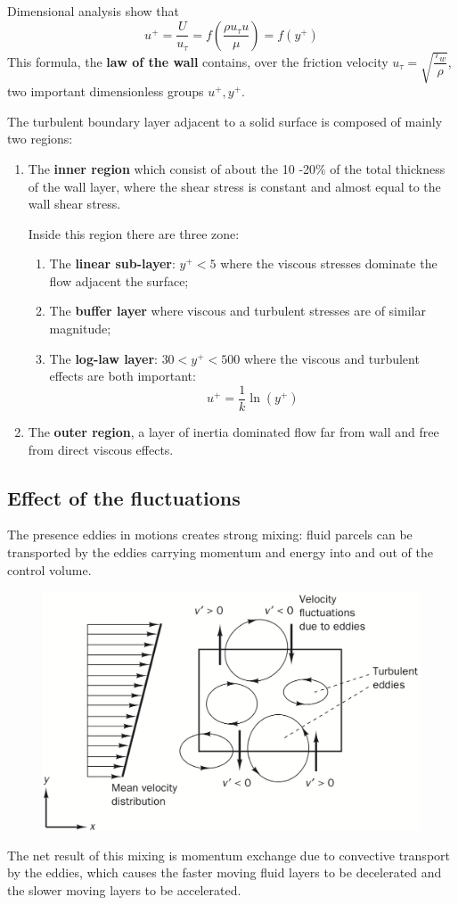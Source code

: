 \documentclass[a4paper, 15pt]{article}
\begin{document}
	Dimensional analysis show that 
	\[u^+ = \dfrac{U}{u_\tau} = f\left(\dfrac{\rho u_\tau u}{\mu}\right) = f(y^+)\] 
	This formula, the \textbf{law of the wall} contains, over the friction velocity \(u_\tau = \sqrt{\dfrac{\tau_w}{\rho}}\), two important dimensionless groups $u^+, y^+$. \newline 
	
	The
	turbulent boundary layer adjacent to a solid surface is composed of mainly two regions:
	\begin{enumerate}
		\item The \textbf{inner region} which consist of about the 10 -20\% of the total thickness of the wall layer, where the shear stress is constant and almost equal to the wall shear stress. 
		
		Inside this region there are three zone:
		\begin{enumerate}
			\item The \textbf{linear sub-layer}: $y^+<5$ where the viscous stresses dominate the flow adjacent the surface;
			
			\item The \textbf{buffer layer} where viscous and turbulent stresses are of similar magnitude;
			
			\item The \textbf{log-law layer}: $30<y^+<500$ where the viscous and turbulent effects are both important:
			\[u^+ = \dfrac{1}{k}\ln(y^+)\]
		\end{enumerate} 
		\item The \textbf{outer region}, a layer of inertia dominated flow far from wall and free from
		direct viscous effects.
	\end{enumerate}

\subsection*{Effect of the fluctuations}

The presence eddies in motions creates strong mixing: fluid parcels can be transported by the eddies carrying momentum and energy into and out of the control volume. 
\begin{figure}[H]
	\centering
	\includegraphics[width=0.5\linewidth]{fig/screenshot001}
	\label{fig:screenshot001}
\end{figure}
The net result of this mixing is momentum exchange due to convective transport by the eddies, which causes the faster moving fluid layers to be decelerated and the slower moving layers to be
accelerated. \newline 
\end{document}
